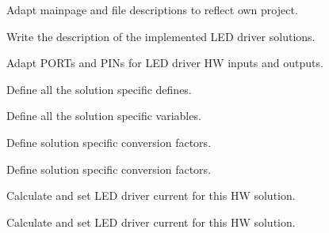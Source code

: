 
\begin{DoxyRefList}
\item[page \mbox{\hyperlink{index}{Moodlight}} ]\label{todo__todo000001}%
%
Adapt mainpage and file descriptions to reflect own project. 
\item[File \mbox{\hyperlink{power_l_e_ds_8c}{power\+L\+E\+Ds.c}} ]\label{todo__todo000002}%
%
Write the description of the implemented L\+ED driver solutions. 
\item[Global \mbox{\hyperlink{power_l_e_ds_8c_aab8056b9ce8aecaa89f41d6e7e037ecc}{P\+W\+R\+\_\+\+D\+A\+C\+\_\+\+P\+O\+RT}} ]\label{todo__todo000003}%
%
Adapt P\+O\+R\+Ts and P\+I\+Ns for L\+ED driver HW inputs and outputs.  
\item[Global \mbox{\hyperlink{power_l_e_ds_8c_a7e73ad5596f8784e5fbd809c2a3f5603}{D\+A\+C\+\_\+\+M\+A\+X\+\_\+\+V\+A\+L\+U\+E\+\_\+\+S\+O\+L3}} ]\label{todo__todo000004}%
%
Define all the solution specific defines.  
\item[Global \mbox{\hyperlink{power_l_e_ds_8c_ae7e35ae4f79c3d31c745bce1a4544848}{P\+W\+R\+\_\+conversion\+\_\+shift}} ]\label{todo__todo000005}%
%
Define all the solution specific variables. ~\newline
  
\item[Global \mbox{\hyperlink{power_l_e_ds_8c_a6bffe685f5851406c5d150c45171ea8f}{P\+W\+R\+\_\+conversion\+\_\+output}} \mbox{[}P\+W\+R\+\_\+\+S\+O\+L\+U\+T\+I\+O\+N\+\_\+\+C\+O\+U\+NT\mbox{]}]\label{todo__todo000006}%
%
Define solution specific conversion factors.  
\item[Global \mbox{\hyperlink{power_l_e_ds_8c_afcbe24fe73b278dd9eb3678c369a9674}{P\+W\+R\+\_\+conversion\+\_\+input}} \mbox{[}P\+W\+R\+\_\+\+S\+O\+L\+U\+T\+I\+O\+N\+\_\+\+C\+O\+U\+NT\mbox{]}]\label{todo__todo000007}%
%
Define solution specific conversion factors.  
\item[Global \mbox{\hyperlink{power_l_e_ds_8c_a72833630f0c07e3a7d9c82a8d0b11309}{P\+W\+R\+\_\+set\+\_\+value}} (uint32\+\_\+t solution, int32\+\_\+t value)]\label{todo__todo000008}%
%
Calculate and set L\+ED driver current for this HW solution. 

\label{todo__todo000009}%
%
Calculate and set L\+ED driver current for this HW solution. 


\end{DoxyRefList}
